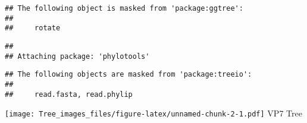 \documentclass[
]{article}
\newenvironment{Shaded}{\begin{snugshade}}{\end{snugshade}}
\newcommand{\CharTok}[1]{\textcolor[rgb]{0.31,0.60,0.02}{#1}}
\newcommand{\DataTypeTok}[1]{\textcolor[rgb]{0.13,0.29,0.53}{#1}}
\newcommand{\FloatTok}[1]{\textcolor[rgb]{0.00,0.00,0.81}{#1}}
\newcommand{\KeywordTok}[1]{\textcolor[rgb]{0.13,0.29,0.53}{\textbf{#1}}}
\newcommand{\NormalTok}[1]{#1}
\newcommand{\OperatorTok}[1]{\textcolor[rgb]{0.81,0.36,0.00}{\textbf{#1}}}
\newcommand{\OtherTok}[1]{\textcolor[rgb]{0.56,0.35,0.01}{#1}}
\newcommand{\StringTok}[1]{\textcolor[rgb]{0.31,0.60,0.02}{#1}}
\begin{document}
\begin{verbatim}
## The following object is masked from 'package:ggtree':
## 
##     rotate
\end{verbatim}

\begin{verbatim}
## 
## Attaching package: 'phylotools'
\end{verbatim}

\begin{verbatim}
## The following objects are masked from 'package:treeio':
## 
##     read.fasta, read.phylip
\end{verbatim}

\begin{Shaded}
\end{Shaded}

\texttt{[image: Tree\_images\_files/figure-latex/unnamed-chunk-2-1.pdf]}
VP7 Tree
\end{document}
